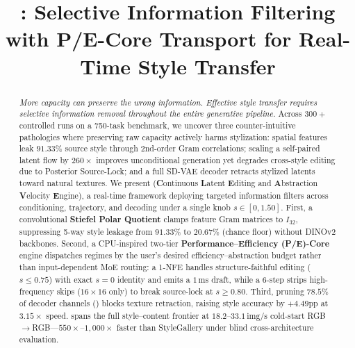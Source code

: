 \documentclass[conference]{IEEEtran}
\begin{document}
\renewcommand{\baselinestretch}{0.95}\selectfont
{}

\title{\method: Selective Information Filtering with P/E-Core Transport for Real-Time Style Transfer}

\author{
}

\maketitle

\begin{abstract}
\emph{More capacity can preserve the wrong information. Effective style transfer requires selective information removal throughout the entire generative pipeline.} Across $300+$ controlled runs on a 750-task benchmark, we uncover three counter-intuitive pathologies where preserving raw capacity actively harms stylization: spatial features leak $91.33\%$ source style through 2nd-order Gram correlations; scaling a self-paired latent flow by $260\times$ improves unconditional generation yet degrades cross-style editing due to Posterior Source-Lock; and a full SD-VAE decoder retracts stylized latents toward natural textures. We present \textbf{\method} (\textbf{C}ontinuous \textbf{L}atent \textbf{E}diting and \textbf{A}bstraction \textbf{V}elocity \textbf{E}ngine), a real-time framework deploying targeted information filters across conditioning, trajectory, and decoding under a single knob $s\in[0,1.50]$. First, a convolutional \textbf{Stiefel Polar Quotient} clamps feature Gram matrices to $I_{32}$, suppressing 5-way style leakage from $91.33\%$ to $20.67\%$ (chance floor) without DINOv2 backbones. Second, a CPU-inspired two-tier \textbf{Performance--Efficiency (P/E)-Core} engine dispatches regimes by the user's desired efficiency--abstraction budget rather than input-dependent MoE routing: a 1-NFE \textbf{\methodecore} handles structure-faithful editing ($s\le 0.75$) with exact $s=0$ identity and emits a $1\,\text{ms}$ draft, while a 6-step \textbf{\methodpcore} strips high-frequency skips ($16\times 16$ only) to break source-lock at $s\ge 0.80$. Third, pruning $78.5\%$ of decoder channels (\textbf{\methoddec}) blocks texture retraction, raising style accuracy by $+4.49\text{pp}$ at $3.15\times$ speed. \textbf{\method} spans the full style--content frontier at $18.2\text{--}33.1\,\text{img/s}$ cold-start RGB$\to$RGB---$550\times\text{--}1{,}000\times$ faster than StyleGallery under blind cross-architecture evaluation.
\end{abstract}
\end{document}

